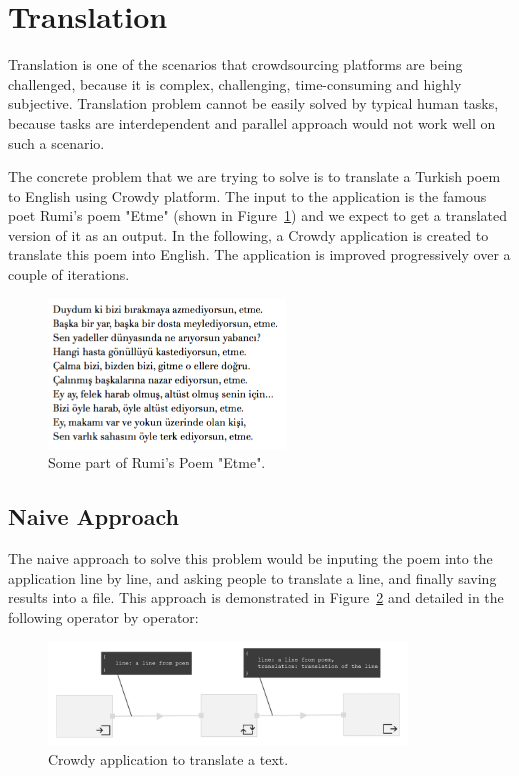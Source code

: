 \newpage
\section{Translation}
Translation is one of the scenarios that crowdsourcing platforms are being challenged, because it is complex, challenging, time-consuming and highly subjective. Translation problem cannot be easily solved by typical human tasks, because tasks are interdependent and parallel approach would not work well on such a scenario.

The concrete problem that we are trying to solve is to translate a Turkish poem to English using Crowdy platform. The input to the application is the famous poet Rumi's poem "Etme" (shown in Figure~\ref{fig:scenario2.poem}) and we expect to get a translated version of it as an output. In the following, a Crowdy application  is created to translate this poem into English. The application is improved progressively over a couple of iterations.

\begin{figure}[ht]
	\centering
	\includegraphics[height=150px]{figures/scenarios/poem.png}
	\caption{Some part of Rumi's Poem "Etme".}
	\label{fig:scenario2.poem}
\end{figure}

\subsection{Naive Approach}
The naive approach to solve this problem would be inputing the poem into the application line by line, and asking people to translate a line, and finally saving results into a file. This approach is demonstrated in Figure~\ref{fig:scenario2} and detailed in the following operator by operator:

\begin{figure}[ht]
	\centering
	\includegraphics[width=0.85\textwidth]{figures/scenarios/scenario2_1a.png}
	\caption{Crowdy application to translate a text.}
	\label{fig:scenario2}
\end{figure}

